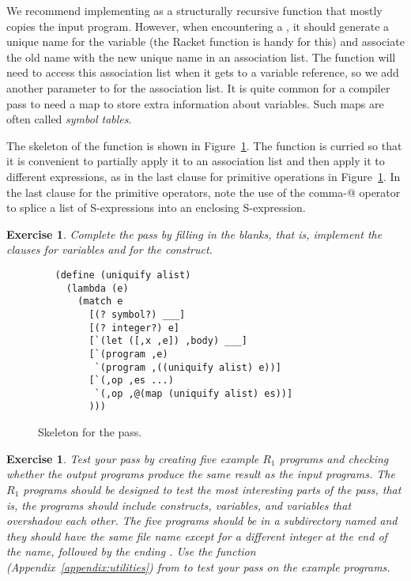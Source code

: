 \documentclass[11pt]{book}
\newtheorem{exercise}[theorem]{Exercise}
\begin{document}
We recommend implementing  as a structurally recursive
function that mostly copies the input program. However, when
encountering a , it should generate a unique name for the
variable (the Racket function  is handy for this) and
associate the old name with the new unique name in an association
list. The  function will need to access this
association list when it gets to a variable reference, so we add
another parameter to  for the association list. It is
quite common for a compiler pass to need a map to store extra
information about variables. Such maps are often called \emph{symbol
  tables}.

The skeleton of the  function is shown in
Figure~\ref{fig:uniquify-s0}.  The function is curried so that it is
convenient to partially apply it to an association list and then apply
it to different expressions, as in the last clause for primitive
operations in Figure~\ref{fig:uniquify-s0}. In the last 
clause for the primitive operators, note the use of the comma-@
operator to splice a list of S-expressions into an enclosing
S-expression.

\begin{exercise}
\normalfont %

Complete the  pass by filling in the blanks, that is,
implement the clauses for variables and for the  construct.
\end{exercise}

\begin{figure}[tbp]
\begin{lstlisting}
   (define (uniquify alist)
     (lambda (e)
       (match e
         [(? symbol?) ___]
         [(? integer?) e]
         [`(let ([,x ,e]) ,body) ___]
         [`(program ,e)
          `(program ,((uniquify alist) e))]
         [`(,op ,es ...)
          `(,op ,@(map (uniquify alist) es))]
         )))
\end{lstlisting}
\caption{Skeleton for the  pass.}
\label{fig:uniquify-s0}
\end{figure}

\begin{exercise}
\normalfont %

Test your  pass by creating five example $R_1$ programs
and checking whether the output programs produce the same result as
the input programs. The $R_1$ programs should be designed to test the
most interesting parts of the  pass, that is, the
programs should include  constructs, variables, and variables
that overshadow each other.  The five programs should be in a
subdirectory named  and they should have the same file name
except for a different integer at the end of the name, followed by the
ending .  Use the  function
(Appendix~\ref{appendix:utilities}) from  to test
your  pass on the example programs.

\end{exercise}
\end{document}
